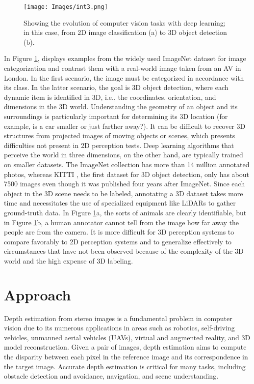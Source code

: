 \documentclass[english, LaM, oneside]{sapthesis}%
\begin{document}
\begin{figure}[H]
    \centering
    \texttt{[image: Images/int3.png]}
    \caption{{Showing the evolution of computer vision tasks with deep learning; in this case, from 2D image classification (a) to 3D object detection (b).}}
    \label{fig:intro1 depth}
\end{figure}
 
In Figure \ref{fig:intro1 depth}, displays examples from the widely used ImageNet \cite{int17} dataset for image categorization and contrast them with a real-world image taken from an AV in London. In the first scenario, the image must be categorized in accordance with its class. In the latter scenario, the goal is 3D object detection, where each dynamic item is identified in 3D, i.e., the coordinates, orientation, and dimensions in the 3D world. Understanding the geometry of an object and its surroundings is particularly important for determining its 3D location (for example, is a car smaller or just farther away?). It can be difficult to recover 3D structures from projected images of moving objects or scenes, which presents difficulties not present in 2D perception tests. 
Deep learning algorithms that perceive the world in three dimensions, on the other hand, are typically trained on smaller datasets. The ImageNet collection has more than 14 million annotated photos, whereas KITTI \cite{int18}, the first dataset for 3D object detection, only has about 7500 images even though it was published four years after ImageNet. Since each object in the 3D scene needs to be labeled, annotating a 3D dataset takes more time and necessitates the use of specialized equipment like LiDARs to gather ground-truth data. In Figure \ref{fig:intro1 depth}a, the sorts of animals are clearly identifiable, but in Figure \ref{fig:intro1 depth}b, a human annotator cannot tell from the image how far away the people are from the camera. 
It is more difficult for 3D perception systems to compare favorably to 2D perception systems and to generalize effectively to circumstances that have not been observed because of the complexity of the 3D world and the high expense of 3D labeling. 





\section{Approach}

\lettrine[lines=2, findent=3pt, nindent=0pt]{D}{}epth estimation from stereo images is a fundamental problem in computer vision due to its numerous applications in areas such as robotics, self-driving vehicles, unmanned aerial vehicles (UAVs), virtual and augmented reality, and 3D model reconstruction. Given a pair of images, depth estimation aims to compute the disparity between each pixel in the reference image and its correspondence in the target image. Accurate depth estimation is critical for many tasks, including obstacle detection and avoidance, navigation, and scene understanding.
\end{document}
